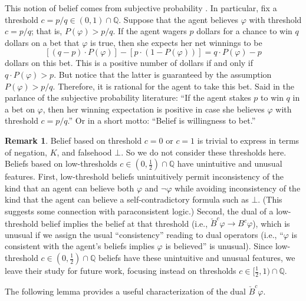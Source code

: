 \documentclass[12pt]{article}
\theoremstyle{definition}
\newtheorem{remark}[theorem]{Remark}
\newcommand{\Rat}{\mathbb{Q}}  %
\begin{document}
This notion of belief comes from subjective probability
\cite{Jeffrey2004:sptrt}.  In particular, fix a threshold
$c=p/q\in(0,1)\cap\Rat$.  Suppose that the agent believes $\varphi$
with threshold $c=p/q$; that is, $P(\varphi)>p/q$.  If the agent
wagers $p$ dollars for a chance to win $q$ dollars on a bet that
$\varphi$ is true, then she expects her net winnings to be
\[
[(q-p)\cdot P(\varphi)] - [p\cdot(1-P(\varphi))] = q\cdot P(\varphi) - p
\]
dollars on this bet.  This is a positive number of dollars if and only
if $q\cdot P(\varphi)>p$.  But notice that the latter is guaranteed by
the assumption $P(\varphi)>p/q$.  Therefore, it is rational for the
agent to take this bet.  Said in the parlance of the subjective
probability literature: ``If the agent stakes $p$ to win $q$ in a bet
on $\varphi$, then her winning expectation is positive in case she
believes $\varphi$ with threshold $c= p/q$.''  Or in a short motto:
``Belief is willingness to bet.''

\begin{remark}
  \label{remark:low-threshold}
  Belief based on threshold $c=0$ or $c=1$ is trivial to express in
  terms of negation, $K$, and falsehood $\bot$.  So we do not consider
  these thresholds here.  Beliefs based on low-thresholds
  $c\in(0,\frac 12)\cap\Rat$ have unintuitive and unusual features.
  First, low-threshold beliefs unintuitively permit inconsistency of
  the kind that an agent can believe both $\varphi$ and $\lnot\varphi$
  while avoiding inconsistency of the kind that the agent can believe
  a self-contradictory formula such as $\bot$. (This suggests some
  connection with paraconsistent logic.)  Second, the dual of a
  low-threshold belief implies the belief at that threshold (i.e.,
  $\check B^c\varphi\to B^c\varphi$), which is unusual if we assign
  the usual ``consistency'' reading to dual operators (i.e.,
  ``$\varphi$ is consistent with the agent's beliefs implies $\varphi$
  is believed'' is unusual).  Since low-threshold
  $c\in(0,\frac12)\cap\Rat$ beliefs have these unintuitive and unusual
  features, we leave their study for future work, focusing instead on
  thresholds $c\in[\frac 12,1)\cap\Rat$.
\end{remark}

The following lemma provides a useful characterization of the dual
$\check B^c\varphi$.
\end{document}
